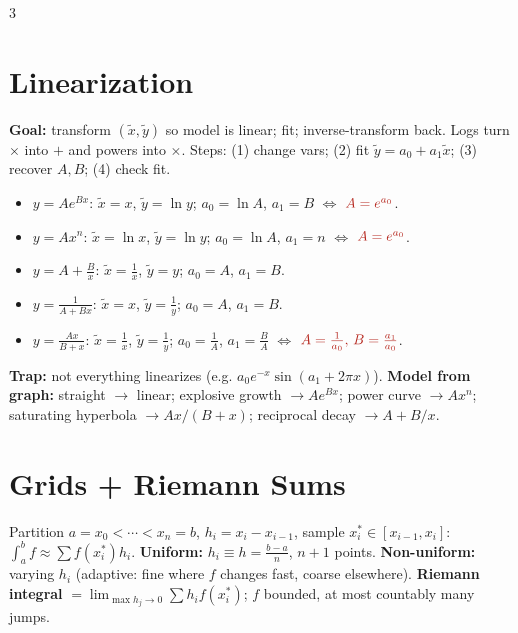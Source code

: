 \documentclass[9pt]{extarticle}
\newcommand{\hl}[1]{\textbf{\textcolor{BrickRed}{#1}}}
\newcommand{\wk}[1]{\textbf{\textcolor{OliveGreen}{#1}}}
\begin{document}
\begin{multicols}{3}
\section{Linearization}
\wk{Goal:} transform $(\tilde x,\tilde y)$ so model is linear; fit; inverse-transform back. Logs turn $\times$ into $+$ and powers into $\times$. Steps: (1) change vars; (2) fit $\tilde y=a_0+a_1\tilde x$; (3) recover $A,B$; (4) check fit.
\begin{itemize}
\item $y=Ae^{Bx}$: $\tilde x=x$, $\tilde y=\ln y$; $a_0=\ln A$, $a_1=B$ $\Leftrightarrow$ $\textcolor{BrickRed}{A=e^{a_0}}$.
\item $y=Ax^n$: $\tilde x=\ln x$, $\tilde y=\ln y$; $a_0=\ln A$, $a_1=n$ $\Leftrightarrow$ $\textcolor{BrickRed}{A=e^{a_0}}$.
\item $y=A+\tfrac{B}{x}$: $\tilde x=\tfrac1x$, $\tilde y=y$; $a_0=A$, $a_1=B$.
\item $y=\tfrac1{A+Bx}$: $\tilde x=x$, $\tilde y=\tfrac1y$; $a_0=A$, $a_1=B$.
\item $y=\tfrac{Ax}{B+x}$: $\tilde x=\tfrac1x$, $\tilde y=\tfrac1y$; $a_0=\tfrac1A$, $a_1=\tfrac{B}{A}$ $\Leftrightarrow$ $\textcolor{BrickRed}{A=\tfrac1{a_0},\,B=\tfrac{a_1}{a_0}}$.
\end{itemize}
\hl{Trap:} not everything linearizes (e.g. $a_0e^{-x}\sin(a_1+2\pi x)$). \wk{Model from graph:} straight $\to$ linear; explosive growth $\to Ae^{Bx}$; power curve $\to Ax^n$; saturating hyperbola $\to Ax/(B+x)$; reciprocal decay $\to A+B/x$.

\section{Grids + Riemann Sums}
\begin{sloppypar}\raggedright
Partition $a=x_0<\cdots<x_n=b$, $h_i=x_i-x_{i-1}$, sample $x_i^*\in[x_{i-1},x_i]$: $\int_a^bf\approx\sum f(x_i^*)h_i$.
\textbf{Uniform:} $h_i\equiv h=\tfrac{b-a}{n}$, $n{+}1$ points. \textbf{Non-uniform:} varying $h_i$ (adaptive: fine where $f$ changes fast, coarse elsewhere).
\textbf{Riemann integral} $=\lim_{\max h_j\to0}\sum h_if(x_i^*)$; $f$ bounded, at most countably many jumps.
\end{sloppypar}


\end{multicols}
\end{document}
